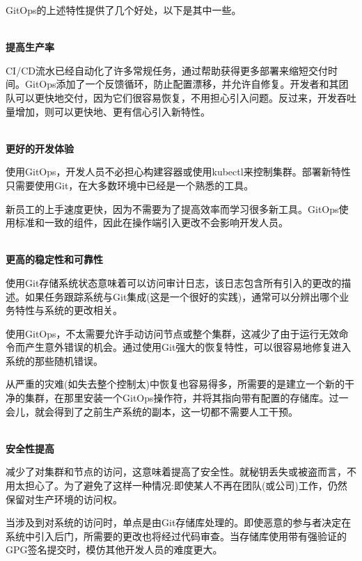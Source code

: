 
GitOps的上述特性提供了几个好处，以下是其中一些。

\hspace*{\fill} \\ %
\noindent
\textbf{提高生产率}

CI/CD流水已经自动化了许多常规任务，通过帮助获得更多部署来缩短交付时间。GitOps添加了一个反馈循环，防止配置漂移，并允许自修复。开发者和其团队可以更快地交付，因为它们很容易恢复，不用担心引入问题。反过来，开发吞吐量增加，则可以更快地、更有信心引入新特性。

\hspace*{\fill} \\ %
\noindent
\textbf{更好的开发体验}

使用GitOps，开发人员不必担心构建容器或使用kubectl来控制集群。部署新特性只需要使用Git，在大多数环境中已经是一个熟悉的工具。

新员工的上手速度更快，因为不需要为了提高效率而学习很多新工具。GitOps使用标准和一致的组件，因此在操作端引入更改不会影响开发人员。

\hspace*{\fill} \\ %
\noindent
\textbf{更高的稳定性和可靠性}

使用Git存储系统状态意味着可以访问审计日志，该日志包含所有引入的更改的描述。如果任务跟踪系统与Git集成(这是一个很好的实践)，通常可以分辨出哪个业务特性与系统的更改相关。

使用GitOps，不太需要允许手动访问节点或整个集群，这减少了由于运行无效命令而产生意外错误的机会。通过使用Git强大的恢复特性，可以很容易地修复进入系统的那些随机错误。

从严重的灾难(如失去整个控制太)中恢复也容易得多，所需要的是建立一个新的干净的集群，在那里安装一个GitOps操作符，并将其指向带有配置的存储库。过一会儿，就会得到了之前生产系统的副本，这一切都不需要人工干预。

\hspace*{\fill} \\ %
\noindent
\textbf{安全性提高}

减少了对集群和节点的访问，这意味着提高了安全性。就秘钥丢失或被盗而言，不用太担心了。为了避免了这样一种情况:即使某人不再在团队(或公司)工作，仍然保留对生产环境的访问权。

当涉及到对系统的访问时，单点是由Git存储库处理的。即使恶意的参与者决定在系统中引入后门，所需要的更改也将经过代码审查。当存储库使用带有强验证的GPG签名提交时，模仿其他开发人员的难度更大。

